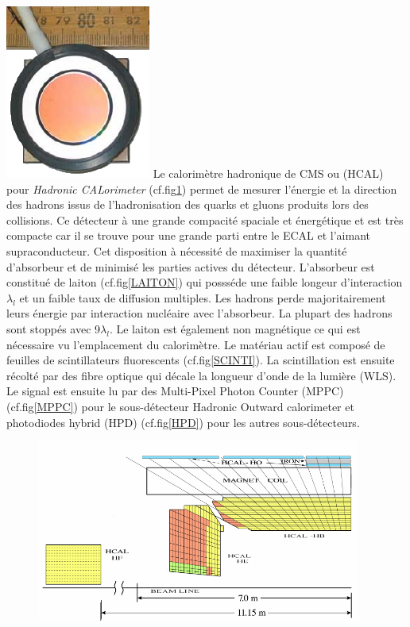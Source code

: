 \marginpar
{
	\centering
	\includegraphics[width=\marginparwidth]{CMS/HPD.png}
	\label{HPD}
}
Le calorimètre hadronique de CMS ou (HCAL) pour \textit{Hadronic CALorimeter} (cf.fig\ref{HCAL}) permet de mesurer l'énergie et la direction des hadrons issus de l'hadronisation des quarks et gluons produits lors des collisions. Ce détecteur à une grande compacité spaciale et énergétique et est très compacte car il se trouve pour une grande parti entre le ECAL et l'aimant supraconducteur. Cet disposition à nécessité de maximiser la quantité d'absorbeur et de minimisé les parties actives du détecteur. L'absorbeur est constitué de laiton (cf.fig\ref{LAITON}) qui possséde une faible longeur d'interaction $\lambda_{l}$ et un faible taux de diffusion multiples. Les hadrons perde majoritairement leurs énergie par interaction nucléaire avec l'absorbeur. La plupart des hadrons sont stoppés avec 9$\lambda_{l}$. Le laiton est également non magnétique ce qui est nécessaire vu l'emplacement du calorimètre. Le matériau actif est composé de feuilles de scintillateurs fluorescents (cf.fig\ref{SCINTI}). La scintillation est ensuite récolté par des fibre optique qui décale la longueur d'onde de la lumière (WLS). Le signal est ensuite lu par des Multi-Pixel Photon Counter (MPPC) (cf.fig\ref{MPPC}) pour le sous-détecteur Hadronic Outward calorimeter et photodiodes hybrid (HPD) (cf.fig\ref{HPD}) pour les autres sous-détecteurs.
\begin{figure}[ht!]
	\centering
	\includegraphics[width=0.95\textwidth]{CMS/HCALSCHEME.png}
	\label{HCAL}
\end{figure}

